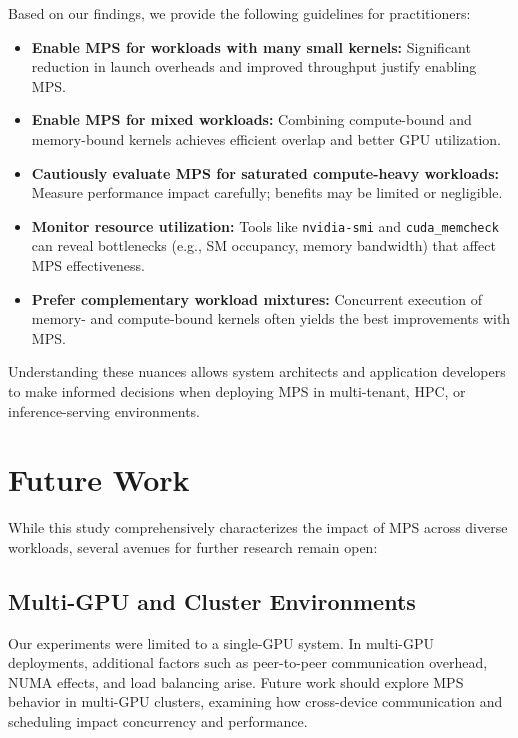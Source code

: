 \documentclass[sigconf,nonacm]{acmart}
\begin{document}
Based on our findings, we provide the following guidelines for practitioners:

\begin{itemize}
    \item \textbf{Enable MPS for workloads with many small kernels:} Significant reduction in launch overheads and improved throughput justify enabling MPS.
    
    \item \textbf{Enable MPS for mixed workloads:} Combining compute-bound and memory-bound kernels achieves efficient overlap and better GPU utilization.
    
    \item \textbf{Cautiously evaluate MPS for saturated compute-heavy workloads:} Measure performance impact carefully; benefits may be limited or negligible.
    
    \item \textbf{Monitor resource utilization:} Tools like \texttt{nvidia-smi} and \texttt{cuda\_memcheck} can reveal bottlenecks (e.g., SM occupancy, memory bandwidth) that affect MPS effectiveness.
    
    \item \textbf{Prefer complementary workload mixtures:} Concurrent execution of memory- and compute-bound kernels often yields the best improvements with MPS.
\end{itemize}

Understanding these nuances allows system architects and application developers to make informed decisions when deploying MPS in multi-tenant, HPC, or inference-serving environments.

\section{Future Work}

While this study comprehensively characterizes the impact of MPS across diverse workloads, several avenues for further research remain open:

\subsection{Multi-GPU and Cluster Environments}

Our experiments were limited to a single-GPU system. In multi-GPU deployments, additional factors such as peer-to-peer communication overhead, NUMA effects, and load balancing arise. Future work should explore MPS behavior in multi-GPU clusters, examining how cross-device communication and scheduling impact concurrency and performance.
\end{document}
